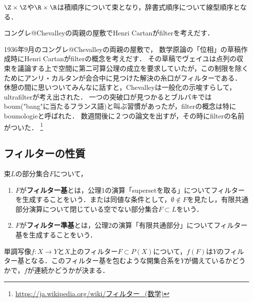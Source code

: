 \documentclass[uplatex,dvipdfmx]{jsreport}
\begin{document}
\begin{example}
    $\Z\times\Z$や$\R\times\R$は積順序について束となり，辞書式順序について線型順序となる．
\end{example}

\begin{history}
    コングレ@Chevalleyの両親の屋敷でHenri Cartanがfilterを考えだす．

    1936年9月のコングレ@Chevalleyの両親の屋敷で，
    数学原論の「位相」の草稿作成時にHenri Cartanがfilterの概念を考えだす．
    その草稿でヴェイユは点列の収束を議論する上で空間に第二可算公理の成立を要求していたが，この制限を除くためにアンリ・カルタンが会合中に見つけた解決の糸口がフィルターである．
    休憩の間に思いついてみんなに話すと，Chevalleyは一般化の示唆すらして，ultrafilterが考え出された．
    一つの突破口が見つかるとブルバキではboum("bang"に当たるフランス語)と叫ぶ習慣があったが，filterの概念は特にboumologieと呼ばれた．
    数週間後に２つの論文を出すが，その時にfilterの名前がついた．
    \footnote{\url{https://ja.wikipedia.org/wiki/フィルター_(数学)}} 
\end{history}

\subsection{フィルターの性質}

\begin{definition}\label{def-filterbase-filtersubbase}
    束$L$の部分集合$F$について，
    \begin{enumerate}
        \item $F$が\textbf{フィルター基}とは，公理1の演算「supersetを取る」についてフィルターを生成することをいう．または同値な条件として，$\emptyset\notin F$を見たし，有限共通部分演算について閉じている空でない部分集合$F\subset L$をいう．
        \item $F$が\textbf{フィルター準基}とは，公理2の演算「有限共通部分」についてフィルター基を生成することをいう．
    \end{enumerate}
    単調写像$f:X\to Y$と$X$上のフィルター$F\subset P(X)$について，$f(F)$は$Y$のフィルター基となる．このフィルター基を包むような開集合系を$Y$が備えているかどうかで，$f$が連続かどうかが決まる．
\end{definition}
\end{document}

